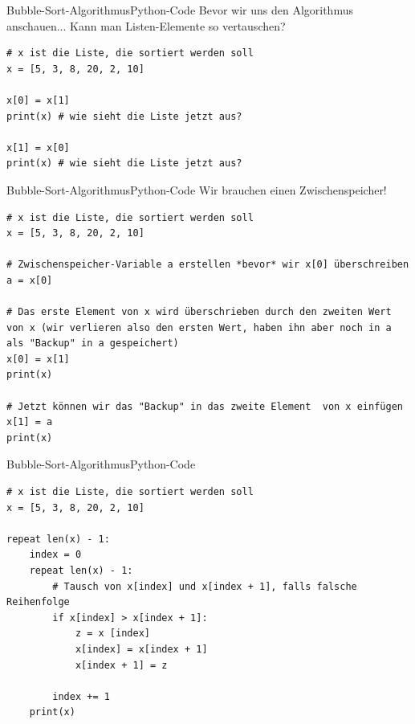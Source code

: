 \begin{frame}[fragile]{Bubble-Sort-Algorithmus}{Python-Code}
Bevor wir uns den Algorithmus anschauen... Kann man Listen-Elemente so vertauschen?
	\begin{lstlisting}
# x ist die Liste, die sortiert werden soll
x = [5, 3, 8, 20, 2, 10]

x[0] = x[1]
print(x) # wie sieht die Liste jetzt aus?

x[1] = x[0]
print(x) # wie sieht die Liste jetzt aus?
	\end{lstlisting}
\end{frame}

\begin{frame}[fragile]{Bubble-Sort-Algorithmus}{Python-Code}
Wir brauchen einen Zwischenspeicher!
	\begin{lstlisting}
# x ist die Liste, die sortiert werden soll
x = [5, 3, 8, 20, 2, 10]

# Zwischenspeicher-Variable a erstellen *bevor* wir x[0] überschreiben
a = x[0] 

# Das erste Element von x wird überschrieben durch den zweiten Wert von x (wir verlieren also den ersten Wert, haben ihn aber noch in a als "Backup" in a gespeichert)
x[0] = x[1]
print(x)

# Jetzt können wir das "Backup" in das zweite Element  von x einfügen
x[1] = a
print(x)
	\end{lstlisting}
\end{frame}

\begin{frame}[fragile]{Bubble-Sort-Algorithmus}{Python-Code}
	\begin{lstlisting}
# x ist die Liste, die sortiert werden soll
x = [5, 3, 8, 20, 2, 10]

repeat len(x) - 1:
    index = 0
    repeat len(x) - 1:
    	# Tausch von x[index] und x[index + 1], falls falsche Reihenfolge
        if x[index] > x[index + 1]:
            z = x [index]
            x[index] = x[index + 1]
            x[index + 1] = z
         
        index += 1
    print(x)
	\end{lstlisting}
\end{frame}

